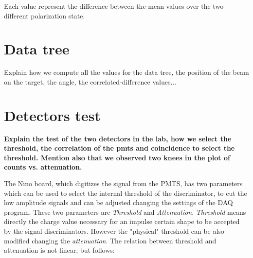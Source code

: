 Each value represent the difference between the mean values over the two different polarization state.

\section{Data tree}
Explain how we compute all the values for the data tree, the position of the beam on the target, the angle, the correlated-difference values...

\section{Detectors test}

{\bfseries Explain the test of the two detectors in the lab, how we select the threshold, the correlation of the pmts and coincidence to select the threshold. Mention also that we observed two knees in the plot of counts vs. attenuation.}

The Nino board, which digitizes the signal from the PMTS, has two parameters which can be used to select the internal threshold of the discriminator, to cut the low amplitude signals and can be adjusted changing the settings of the DAQ program. These two parameters are \textit{Threshold} and \textit{Attenuation}. \textit{Threshold} means directly the charge value necessary for an impulse certain shape to be accepted by the signal discriminators. However the "physical" threshold can be also modified changing the \textit{attenuation}. The relation between threshold and attenuation is not linear, but follows:

\begin{figure}[hbtp]
\centering
{}
\end{figure}

